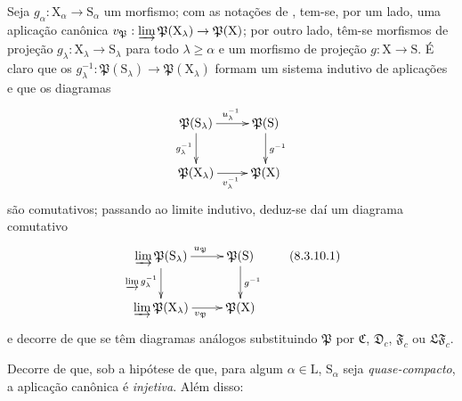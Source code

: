 \begin{env}[8.3.10]
\label{IV.8.3.10}
Seja $g_\alpha:\mathrm{X}_\alpha\to\mathrm{S}_\alpha$ um morfismo; com as notações de , tem-se, por um lado, uma aplicação canônica $v_\mathfrak{P}:\varinjlim\mathfrak{P}(\mathrm{X}_\lambda)\to\mathfrak{P}(\mathrm{X})$; por outro lado, têm-se morfismos de projeção $g_\lambda:\mathrm{X}_\lambda\to\mathrm{S}_\lambda$ para todo $\lambda\geqslant\alpha$ e um morfismo de projeção $g:\mathrm{X}\to\mathrm{S}$.
É claro que os $g_\lambda^{-1}:\mathfrak{P}(\mathrm{S}_\lambda)\to\mathfrak{P}(\mathrm{X}_\lambda)$ formam um sistema indutivo de aplicações e que os diagramas
\[
\xymatrix{
  \mathfrak{P}(\mathrm{S}_\lambda) \ar[r]^{u_\lambda^{-1}} \ar[d]_{g_\lambda^{-1}} & \mathfrak{P}(\mathrm{S}) \ar[d]^{g^{-1}} \\
  \mathfrak{P}(\mathrm{X}_\lambda) \ar[r]_{v_\lambda^{-1}} & \mathfrak{P}(\mathrm{X})
}
\]
são comutativos; passando ao limite indutivo, deduz-se daí um diagrama comutativo
\begin{equation}
\xymatrix{
  \varinjlim\mathfrak{P}(\mathrm{S}_\lambda) \ar[r]^{u_\mathfrak{P}} \ar[d]_{\varinjlim g_\lambda^{-1}} & \mathfrak{P}(\mathrm{S}) \ar[d]^{g^{-1}} \\
  \varinjlim\mathfrak{P}(\mathrm{X}_\lambda) \ar[r]_{v_\mathfrak{P}} & \mathfrak{P}(\mathrm{X})
}
\tag{8.3.10.1}
\label{IV.8.3.10.1}
\end{equation}
e decorre de  que se têm diagramas análogos substituindo $\mathfrak{P}$ por $\mathfrak{C}$, $\mathfrak{D}_c$, $\mathfrak{F}_c$ ou $\mathfrak{LF}_c$.
\end{env}

Decorre de  que, sob a hipótese de que, para algum $\alpha\in\mathrm{L}$, $\mathrm{S}_\alpha$ seja \emph{quase-compacto}, a aplicação canônica  é \emph{injetiva}.
Além disso:

